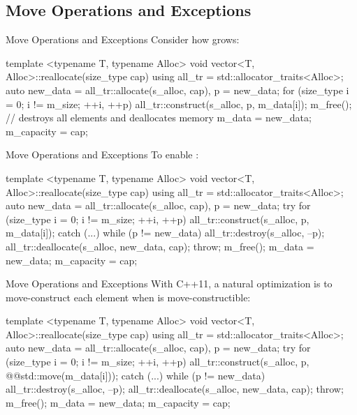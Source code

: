 \documentclass{beamer}
\begin{document}
\subsection{Move Operations and Exceptions}

\begin{frame}[fragile]{Move Operations and Exceptions}
  Consider how  grows:
  \begin{cpp}[\scriptsize]
template <typename T, typename Alloc>
void vector<T, Alloc>::reallocate(size_type cap) {
  using all_tr = std::allocator_traits<Alloc>;
  auto new_data = all_tr::allocate(s_alloc, cap), p = new_data;
  for (size_type i = 0; i != m_size; ++i, ++p)
    all_tr::construct(s_alloc, p, m_data[i]);
  m_free(); // destroys all elements and deallocates memory
  m_data = new_data;
  m_capacity = cap;
}
  \end{cpp}
\end{frame}

\begin{frame}[fragile]{Move Operations and Exceptions}
  To enable :
  \begin{cpp}[\scriptsize]
template <typename T, typename Alloc>
void vector<T, Alloc>::reallocate(size_type cap) {
  using all_tr = std::allocator_traits<Alloc>;
  auto new_data = all_tr::allocate(s_alloc, cap), p = new_data;
  try {
    for (size_type i = 0; i != m_size; ++i, ++p)
      all_tr::construct(s_alloc, p, m_data[i]);
  } catch (...) {
    while (p != new_data)
      all_tr::destroy(s_alloc, --p);
    all_tr::deallocate(s_alloc, new_data, cap);
    throw;
  }
  m_free();
  m_data = new_data;
  m_capacity = cap;
}
  \end{cpp}
\end{frame}

\begin{frame}[fragile]{Move Operations and Exceptions}
  With C++11, a natural optimization is to move-construct each element when  is move-constructible:
  \begin{cpp}[\scriptsize]
template <typename T, typename Alloc>
void vector<T, Alloc>::reallocate(size_type cap) {
  using all_tr = std::allocator_traits<Alloc>;
  auto new_data = all_tr::allocate(s_alloc, cap), p = new_data;
  try {
    for (size_type i = 0; i != m_size; ++i, ++p)
      all_tr::construct(s_alloc, p, @\scriptsizepinkbox[10em]@std::move(m_data[i]));
  } catch (...) {
    while (p != new_data)
      all_tr::destroy(s_alloc, --p);
    all_tr::deallocate(s_alloc, new_data, cap);
    throw;
  }
  m_free();
  m_data = new_data;
  m_capacity = cap;
}
  \end{cpp}
\end{frame}
\end{document}
